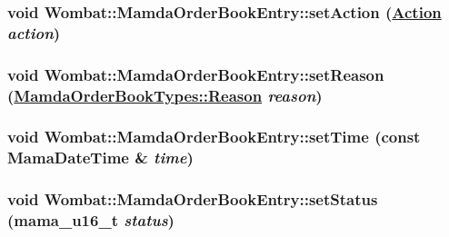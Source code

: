 \hypertarget{classWombat_1_1MamdaOrderBookEntry_57ad02d4d138a273e6471e900fdf2c14}{
\subsubsection[setAction]{\setlength{\rightskip}{0pt plus 5cm}void Wombat::Mamda\-Order\-Book\-Entry::set\-Action (\hyperlink{classWombat_1_1MamdaOrderBookEntry_fc6cb1d67c7601d093a36f59cf9bcef4}{Action} {\em action})}}
\label{classWombat_1_1MamdaOrderBookEntry_57ad02d4d138a273e6471e900fdf2c14}


\hypertarget{classWombat_1_1MamdaOrderBookEntry_0474d09c574c9fab3b2340c5d1aeff6d}{
\subsubsection[setReason]{\setlength{\rightskip}{0pt plus 5cm}void Wombat::Mamda\-Order\-Book\-Entry::set\-Reason (\hyperlink{classWombat_1_1MamdaOrderBookTypes_a1147c14315f68b9371c92a6a259fbd5}{Mamda\-Order\-Book\-Types::Reason} {\em reason})}}
\label{classWombat_1_1MamdaOrderBookEntry_0474d09c574c9fab3b2340c5d1aeff6d}


\hypertarget{classWombat_1_1MamdaOrderBookEntry_10387ca9c9405ffcaa167ae9b93127ac}{
\subsubsection[setTime]{\setlength{\rightskip}{0pt plus 5cm}void Wombat::Mamda\-Order\-Book\-Entry::set\-Time (const Mama\-Date\-Time \& {\em time})}}
\label{classWombat_1_1MamdaOrderBookEntry_10387ca9c9405ffcaa167ae9b93127ac}


\hypertarget{classWombat_1_1MamdaOrderBookEntry_d54939cc5ed80ff7d4f282e0fa0f5aac}{
\subsubsection[setStatus]{\setlength{\rightskip}{0pt plus 5cm}void Wombat::Mamda\-Order\-Book\-Entry::set\-Status (mama\_\-u16\_\-t {\em status})}}
\label{classWombat_1_1MamdaOrderBookEntry_d54939cc5ed80ff7d4f282e0fa0f5aac}


